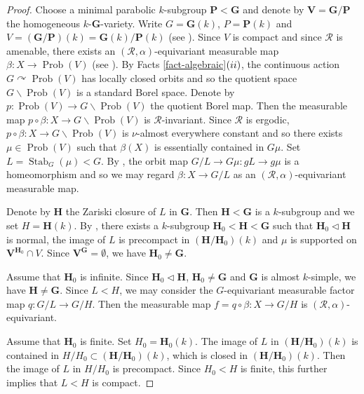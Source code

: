 \documentclass[11pt]{amsart}
\numberwithin{equation}{section}
\theoremstyle{plain}
\theoremstyle{definition}
\newcommand{\Stab}{\operatorname{Stab}}
\newcommand{\Prob}{\operatorname{Prob}}
\begin{document}
\begin{proof}
Choose a minimal parabolic $k$-subgroup $\mathbf P < \mathbf G$ and denote by $\mathbf V = \mathbf G/\mathbf P$ the homogeneous $k$-$\mathbf G$-variety. Write $G = \mathbf G(k)$, $P = \mathbf P(k)$ and $V = (\mathbf G/\mathbf P)(k) = \mathbf G(k)/\mathbf P(k)$ (see \cite[Proposition 20.5]{Bo91}). Since $V$ is compact and since $\mathscr R$ is amenable, there exists an $(\mathscr R, \alpha)$-equivariant measurable map $\beta : X \to \Prob(V)$ (see \cite[Proposition 4.3.9]{Zi84}). By Facts \ref{fact-algebraic}$(\rm ii)$, the continuous action $G \curvearrowright \Prob(V)$ has locally closed orbits and so the quotient space $G\backslash \Prob(V)$ is a standard Borel space. Denote by $p : \Prob(V) \to G\backslash\Prob(V)$ the quotient Borel map. Then the measurable map $p \circ \beta : X \to G\backslash\Prob(V)$ is $\mathscr R$-invariant. Since $\mathscr R$ is ergodic, $p \circ \beta : X \to G\backslash\Prob(V)$ is $\nu$-almost everywhere constant and so there exists $\mu \in \Prob(V)$ such that $\beta(X)$ is essentially contained in $G \mu$. Set $L = \Stab_G(\mu) < G$. By \cite[Theorem 2.1.14]{Zi84}, the orbit map $G/L \to G\mu : gL \to g\mu$ is a homeomorphism and so we may regard $\beta : X \to G/L$ as an $(\mathscr R, \alpha)$-equivariant measurable map.

Denote by $\mathbf H$ the Zariski closure of $L$ in $\mathbf G$. Then $\mathbf H < \mathbf G$ is a $k$-subgroup and we set $H = \mathbf H(k)$. By \cite[Proposition 1.9]{BDL14}, there exists a $k$-subgroup $\mathbf H_0 < \mathbf H < \mathbf G$ such that $\mathbf H_0 \lhd \mathbf H$ is normal, the image of $L$ is precompact in $(\mathbf H/\mathbf H_0)(k)$ and $\mu$ is supported on $\mathbf V^{\mathbf H_0} \cap V$. Since $\mathbf V^{\mathbf G} = \emptyset$, we have $\mathbf H_0 \neq \mathbf G$. 

Assume that $\mathbf H_0$ is infinite. Since $\mathbf H_0 \lhd \mathbf H$, $\mathbf H_0 \neq \mathbf G$ and $\mathbf G$ is almost $k$-simple, we have $\mathbf H \neq \mathbf G$. Since $L < H$, we may consider the $G$-equivariant measurable factor map $q : G/L \to G/H$. Then the measurable map $f = q \circ \beta : X \to G/H$ is $(\mathscr R, \alpha)$-equivariant. 

Assume that $\mathbf H_0$ is finite. Set $H_0 = \mathbf H_0(k)$. The image of $L$ in $(\mathbf H/\mathbf H_0)(k)$ is contained in $H/H_0 \subset (\mathbf H/\mathbf H_0)(k)$, which is closed in $(\mathbf H/\mathbf H_0)(k)$. Then the image of $L$ in $H/H_0$ is precompact. Since $H_0 < H$ is finite, this further implies that $L < H$ is compact.
\end{proof}
\end{document}

